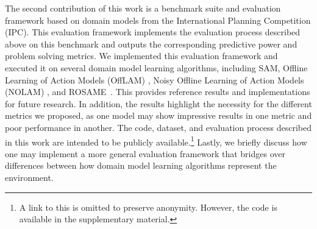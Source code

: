 \documentclass[letterpaper]{article} %
\newcommand{\sam}{\ac{SAM}\xspace}
\newif\ifaddcomments
\newcommand{\roni}[1]{\ifaddcomments{\textcolor{red}{[Roni: #1]}}\fi}
\begin{document}
The second contribution of this work is a benchmark suite and evaluation framework based on domain models from the International Planning Competition (IPC). 
This evaluation framework implements the evaluation process described above on this benchmark and outputs the corresponding predictive power and problem solving metrics. 
We implemented this evaluation framework and executed it on several domain model learning algorithms, including \sam \citep{juba2021safe}, Offline Learning of Action Models (OffLAM) \citep{LAMANNA2025104256}, Noisy Offline Learning of Action Models (NOLAM) \citep{Lamanna24}, and ROSAME~\cite{xi2024neuro}. 
This provides reference results and implementations for future research. 
In addition, the results highlight the necessity for the different metrics we proposed, as one model may show impressive results in one metric and poor performance in another. \roni{Is this clear enough?}
The code, dataset, and evaluation process described in this work are intended to be publicly available.\footnote{A link to this is omitted to preserve anonymity. However, the code is available in the supplementary material.} 
Lastly, we briefly discuss how one may implement a more general evaluation framework that bridges over differences between how domain model learning algorithms represent the environment. 



\end{document}
